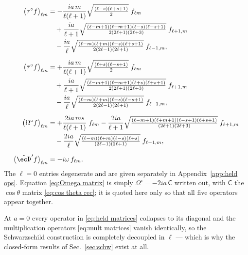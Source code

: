 \documentclass[preprint,aps,nofootinbib,a4paper,superscriptaddress,longbibliography,amsfonts, amssymb,amsmath,titlepage]{revtex4-1}
\numberwithin{equation}{section} %
\def\tah{{\tau}^\circ}
\def\tabh{{\bar\tau}^\circ}
\def\Oh{{\Omega}^\circ}
\def\thpH{\tilde{\th}'}
\def\th{\hbox{\ec\char'336}}
\newcommand{\emm}{m}
\def\l{\ensuremath{\ell}}
\def\non{\nonumber \\}
\begin{document}
\begin{subequations}\label{eq:mult matrices}
\begin{align}
\big(\tah f\big)_{\l\emm}
&=
-\frac{ia\,\emm}{\l(\l+1)}\sqrt{\tfrac{(\l-s)(\l+s+1)}{2}}\;f_{\l\emm}
\non
&\quad
+\frac{ia}{\l+1}
\sqrt{\tfrac{(\l-\emm+1)(\l+\emm+1)(\l-s)(\l-s+1)}{2(2\l+1)(2\l+3)}}\;f_{\l+1,\emm}
\non
&\quad
-\frac{ia}{\l}
\sqrt{\tfrac{(\l-\emm)(\l+\emm)(\l+s)(\l+s+1)}{2(2\l-1)(2\l+1)}}\;f_{\l-1,\emm},
\label{eq:tau matrix}\\[6pt]
\big(\tabh f\big)_{\l\emm}
&=
+\frac{ia\,\emm}{\l(\l+1)}\sqrt{\tfrac{(\l+s)(\l-s+1)}{2}}\;f_{\l\emm}
\non
&\quad
+\frac{ia}{\l+1}
\sqrt{\tfrac{(\l-\emm+1)(\l+\emm+1)(\l+s)(\l+s+1)}{2(2\l+1)(2\l+3)}}\;f_{\l+1,\emm}
\non
&\quad
-\frac{ia}{\l}
\sqrt{\tfrac{(\l-\emm)(\l+\emm)(\l-s)(\l-s+1)}{2(2\l-1)(2\l+1)}}\;f_{\l-1,\emm},
\label{eq:taubar matrix}\\[6pt]
\big(\Oh f\big)_{\l\emm}
&=
+\frac{2ia\,\emm s}{\l(\l+1)}\;f_{\l\emm}
-\frac{2ia}{\l+1}
\sqrt{\tfrac{(\l-\emm+1)(\l+\emm+1)(\l-s+1)(\l+s+1)}{(2\l+1)(2\l+3)}}\;f_{\l+1,\emm}
\non
&\quad
-\frac{2ia}{\l}
\sqrt{\tfrac{(\l-\emm)(\l+\emm)(\l-s)(\l+s)}{(2\l-1)(2\l+1)}}\;f_{\l-1,\emm},
\label{eq:Omega matrix}\\[6pt]
\big(\thpH f\big)_{\l\emm} &= -i\omega\,f_{\l\emm}.
\label{eq:thornp matrix}
\end{align}
\end{subequations}
The $\l=0$ entries degenerate and are given separately in
Appendix~\ref{app:held ops}.  Equation \eqref{eq:Omega matrix} is simply
$\Oh=-2ia\,\mathsf C$ written out, with $\mathsf C$ the $\cos\theta$ matrix
\eqref{eq:cos theta rec}; it is quoted here only so that all five operators
appear together.

At $a=0$ every operator in \eqref{eq:held matrices} collapses to its diagonal
and the multiplication operators \eqref{eq:mult matrices} vanish identically,
so the Schwarzschild construction is completely decoupled in $\l$ --- which
is why the closed-form results of Sec.~\ref{sec:schw} exist at all.
\end{document}
